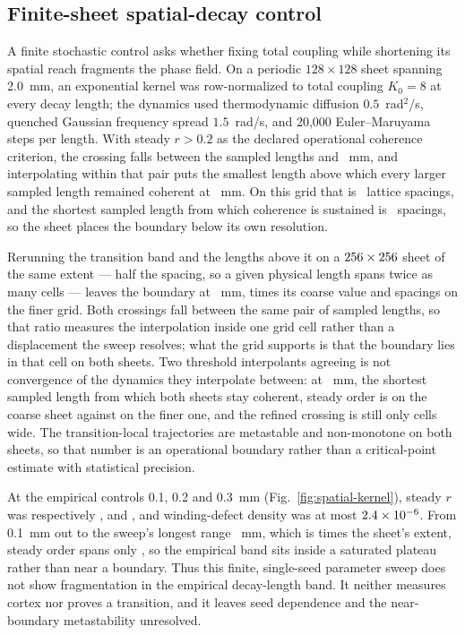 \documentclass{article}
\begin{document}
\subsection{Finite-sheet spatial-decay control}

A finite stochastic control asks whether fixing total coupling while shortening its spatial reach fragments the phase field. On a periodic $128\times128$ sheet spanning 2.0~mm, an exponential kernel was row-normalized to total coupling $K_0=8$ at every decay length; the dynamics used thermodynamic diffusion $0.5$~rad$^2$/s, quenched Gaussian frequency spread $1.5$~rad/s, and 20,000 Euler--Maruyama steps per length. With steady $r>0.2$ as the declared operational coherence criterion, the crossing falls between the sampled lengths \spatialBracketLow{} and \spatialBracketHigh~mm, and interpolating within that pair puts the smallest length above which every larger sampled length remained coherent at \spatialCriticalDecay~mm. On this grid that is \spatialCriticalDecayCells~lattice spacings, and the shortest sampled length from which coherence is sustained is \spatialResolvedDecayCells~spacings, so the sheet places the boundary below its own resolution.

Rerunning the transition band and the lengths above it on a $256\times256$ sheet of the same extent --- half the spacing, so a given physical length spans twice as many cells --- leaves the boundary at \spatialRefinedCriticalDecay~mm, \spatialRefinedBoundaryRatio{} times its coarse value and \spatialRefinedCriticalDecayCells{} spacings on the finer grid. Both crossings fall between the same pair of sampled lengths, so that ratio measures the interpolation inside one grid cell rather than a displacement the sweep resolves; what the grid supports is that the boundary lies in that cell on both sheets. Two threshold interpolants agreeing is not convergence of the dynamics they interpolate between: at \spatialSharedCoherentDecay~mm, the shortest sampled length from which both sheets stay coherent, steady order is \spatialSharedCoarseOrder{} on the coarse sheet against \spatialSharedRefinedOrder{} on the finer one, and the refined crossing is still only \spatialRefinedCriticalDecayCells{} cells wide. The transition-local trajectories are metastable and non-monotone on both sheets, so that number is an operational boundary rather than a critical-point estimate with statistical precision.

At the empirical controls 0.1, 0.2 and 0.3~mm (Fig.~\ref{fig:spatial-kernel}), steady $r$ was respectively \spatialOrderOne, \spatialOrderTwo{} and \spatialOrderThree, and winding-defect density was at most $2.4\times10^{-6}$. From 0.1~mm out to the sweep's longest range \spatialPlateauMax~mm, which is \spatialPlateauExtentRatio{} times the sheet's extent, steady order spans only \spatialPlateauSpread, so the empirical band sits inside a saturated plateau rather than near a boundary. Thus this finite, single-seed parameter sweep does not show fragmentation in the empirical decay-length band. It neither measures cortex nor proves a transition, and it leaves seed dependence and the near-boundary metastability unresolved.
\end{document}

